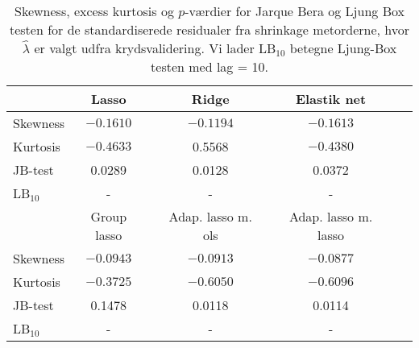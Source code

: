 \begin{table}
\center
\begin{tabular}{lrrrrrrrrrr} 
\toprule
& \multicolumn{2}{c}{Lasso} && \multicolumn{2}{c}{Ridge } && \multicolumn{2}{c}{Elastik net} \\ \midrule
Skewness & \multicolumn{2}{c}{$-0.1610$} &&\multicolumn{2}{c}{$-0.1194$} && \multicolumn{2}{c}{$- 0.1613$} \\
Kurtosis & \multicolumn{2}{c}{$ -0.4633 $} && \multicolumn{2}{c}{0.5568} &&\multicolumn{2}{c}{$-0.4380$} \\
JB-test & \multicolumn{2}{c}{0.0289} && \multicolumn{2}{c}{0.0128} && \multicolumn{2}{c}{0.0372}  \\
LB$_{10}$ &  \multicolumn{2}{c}{-} &&  \multicolumn{2}{c}{-} &&  \multicolumn{2}{c}{-} \\  \bottomrule \toprule
 & \multicolumn{2}{c}{Group lasso} && \multicolumn{2}{c}{Adap. lasso m. ols}  && \multicolumn{2}{c}{Adap. lasso m. lasso} \\ \midrule
Skewness & \multicolumn{2}{c}{$-0.0943$} &&  \multicolumn{2}{c}{$-0.0913$} && \multicolumn{2}{c}{$-0.0877$} \\
Kurtosis & \multicolumn{2}{c}{$-0.3725$} &&   \multicolumn{2}{c}{$-0.6050 $} && \multicolumn{2}{c}{$-0.6096$} \\
JB-test & \multicolumn{2}{c}{0.1478}  &&  \multicolumn{2}{c}{0.0118} &&  \multicolumn{2}{c}{0.0114} \\ 
LB$_{10}$ &  \multicolumn{2}{c}{-} &&  \multicolumn{2}{c}{-} &&  \multicolumn{2}{c}{-} \\ \bottomrule
 \end{tabular}
\caption{Skewness, excess kurtosis og \(p\)-værdier for Jarque Bera og Ljung Box testen for de standardiserede residualer fra shrinkage metorderne, hvor $\widehat{\lambda}$ er valgt udfra krydsvalidering. Vi lader LB$_{10}$ betegne Ljung-Box testen med lag = 10. } \label{tab:res_shrinkage_tab}
\end{table}